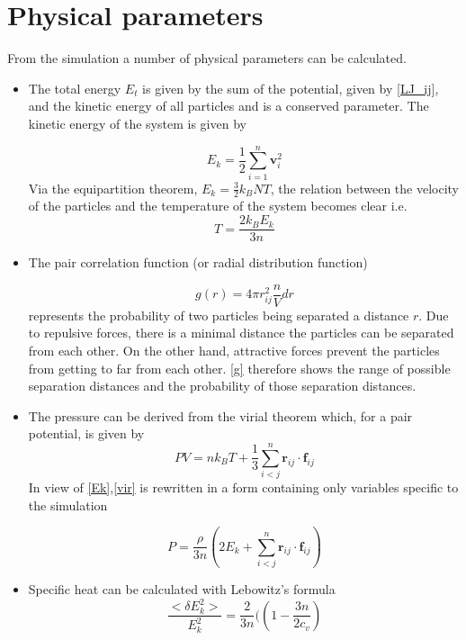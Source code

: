 \documentclass[10pt,a4paper,notitlepage]{article}
\begin{document}
\section{Physical parameters}\label{sec:phys}
From the simulation a number of physical parameters can be calculated.
\begin{itemize}
\item The total energy $E_t$ is given by the sum of the potential, given by \eqref{LJ_ij}, and the kinetic energy of all particles and is a conserved parameter. The kinetic energy of the system is given by 

\begin{equation}\label{Ek}
E_k = \frac{1}{2}\displaystyle\sum^n_{i=1}\textbf{v}^2_i 
\end{equation}
Via the equipartition theorem, $E_k = \frac{3}{2}k_BNT$, the relation between the velocity of the particles and the temperature of the system becomes clear i.e.
\begin{equation}\label{T}
T = \frac{2k_BE_k}{3n}
\end{equation}
\item The pair correlation function (or radial distribution function)

\begin{equation}\label{g}
g(r) = 4\pi r^2_{ij} \frac{n}{V}dr
\end{equation} 
represents the probability of two particles being separated a distance $r$. Due to repulsive forces, there is a minimal distance the particles can be separated from each other. On the other hand, attractive forces prevent the particles from getting to far from each other. \eqref{g} therefore shows the range of possible separation distances and the probability of those separation distances.

\item The pressure can be derived from the virial theorem which, for a pair potential, is given by
\begin{equation}\label{vir}
PV =  nk_BT + \frac{1}{3} \displaystyle\sum^n_{i<j} \textbf{r}_{ij}\cdot\textbf{f}_{ij}
\end{equation}
In view of \eqref{Ek},\eqref{vir} is rewritten in a form containing only variables specific to the simulation


\begin{equation}
P = \frac{\rho}{3n}\left(2E_k + \displaystyle\sum^n_{i<j}\textbf{r}_{ij}\cdot\textbf{f}_{ij}\right) 
\end{equation}

\item Specific heat can be calculated with Lebowitz's formula
\begin{equation}
\frac{<\delta E_k^2>}{E_k^2} = \frac{2}{3n}(\left( 1-\frac{3n}{2c_v}\right)
\end{equation}


\end{itemize}
\end{document}
